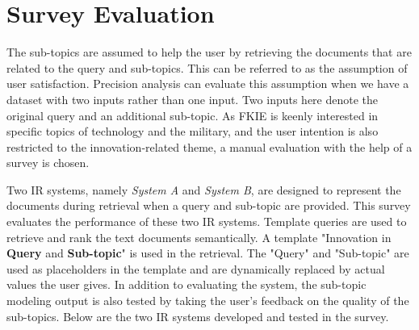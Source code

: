 \section{Survey Evaluation}

The sub-topics are assumed to help the user by retrieving the documents that are related to the query and sub-topics. This can be referred to as the assumption of user satisfaction. Precision analysis can evaluate this assumption when we have a dataset with two inputs rather than one input. Two inputs here denote the original query and an additional sub-topic. As \ac{FKIE} is keenly interested in specific topics of technology and the military, and the user intention is also restricted to the innovation-related theme, a manual evaluation with the help of a survey is chosen.



Two \ac{IR} systems, namely \textit{System A} and \textit{System B}, are designed to represent the documents during retrieval when a query and sub-topic are provided. This survey evaluates the performance of these two \ac{IR} systems. Template queries are used to retrieve and rank the text documents semantically. A template "Innovation in \textbf{Query} and \textbf{Sub-topic}" is used in the retrieval. The "Query" and "Sub-topic" are used as placeholders in the template and are dynamically replaced by actual values the user gives. In addition to evaluating the system, the sub-topic modeling output is also tested by taking the user's feedback on the quality of the sub-topics. Below are the two \ac{IR} systems developed and tested in the survey.


